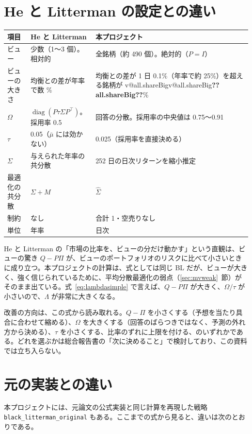 \documentclass[xelatex,ja=standard,jafont=hiragino-pron,a4paper,11pt,openany]{bxjsreport}
\makeatletter
\newcommand{\V}[1]{\ifcsname v@#1\endcsname\csname v@#1\endcsname\else\textbf{??#1??}\fi}
\newcommand{\code}[1]{\texttt{#1}}
\newcommand{\T}{^{\top}}
\newcommand{\mub}{\bar{\mu}}
\DeclareMathOperator{\diag}{diag}
\newcommand{\secref}[1]{\ref{#1}~節}
\makeatother
\begin{document}
\section{He と Litterman の設定との違い}

\begin{center}
\small
\begin{tabular}{p{2.8cm}p{4.6cm}p{5.4cm}}
\toprule
項目 & He と Litterman & 本プロジェクト \\
\midrule
ビュー & 少数（1〜3 個）。相対的 & 全銘柄（約 490 個）。絶対的（$P = I$） \\
ビューの大きさ & 均衡との差が年率で数 \% & 均衡との差が 1 日 0.1\%（年率で約 25\%）を超える銘柄が \V{all.shareBig}\% \\
$\Omega$ & $\diag(P\tau\Sigma P\T)$。採用率 0.5 & 回答の分散。採用率の中央値は 0.75〜0.91 \\
$\tau$ & 0.05（$\mub$ には効かない） & 0.025（採用率を直接決める） \\
$\Sigma$ & 与えられた年率の共分散 & 252 日の日次リターンを縮小推定 \\
最適化の共分散 & $\Sigma + M$ & $\hat\Sigma$ \\
制約 & なし & 合計 1・空売りなし \\
単位 & 年率 & 日次 \\
\bottomrule
\end{tabular}
\end{center}

He と Litterman の「市場の比率を、ビューの分だけ動かす」という直観は、ビューの驚き $Q - P\Pi$ が、ビューのポートフォリオのリスクに比べて小さいときに成り立つ。本プロジェクトの計算は、式としては同じ BL だが、ビューが大きく、強く信じられているために、平均分散最適化の弱点（\secref{sec:mvweak}）がそのまま出ている。式~\eqref{eq:lambdasimple} で言えば、$Q - P\Pi$ が大きく、$\Omega/\tau$ が小さいので、$\Lambda$ が非常に大きくなる。

改善の方向は、この式から読み取れる。$Q - \Pi$ を小さくする（予想を当たり具合に合わせて縮める）、$\Omega$ を大きくする（回答のばらつきではなく、予測の外れ方から決める）、$\tau$ を小さくする、比率のずれに上限を付ける、のいずれかである。どれを選ぶかは総合報告書の「次に決めること」で検討しており、この資料では立ち入らない。

\section{元の実装との違い}\label{sec:original}

本プロジェクトには、元論文の公式実装と同じ計算を再現した戦略 \code{black\_litterman\_original} もある。ここまでの式から見ると、違いは次のとおりである。
\end{document}
